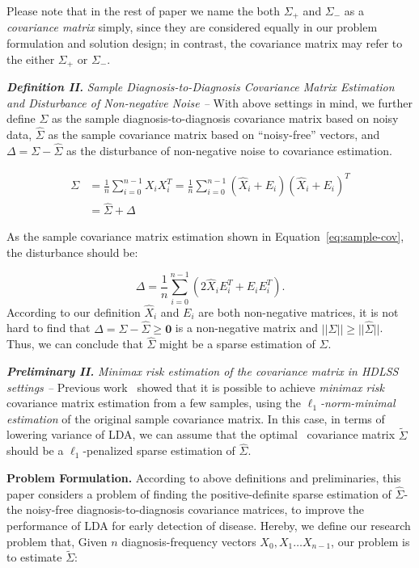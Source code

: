 Please note that in the rest of paper we name the both $\Sigma_{+}$ and $\Sigma_{-}$  as a \emph{covariance matrix} simply, since they are considered equally in our problem formulation and solution design; in contrast, the covariance matrix may refer to the either $\Sigma_{+}$ or $\Sigma_{-}$.


\textbf{\em Definition II.} \emph{Sample Diagnosis-to-Diagnosis Covariance Matrix Estimation and Disturbance of Non-negative Noise -- } With above settings in mind, we further define $\Sigma$ as the sample diagnosis-to-diagnosis covariance matrix based on noisy data, $\hat{\Sigma}$ as the sample covariance matrix based on ``noisy-free'' vectors, and  $\Delta=\Sigma-\hat{\Sigma}$ as the disturbance of non-negative noise to covariance estimation.

\begin{equation}
\begin{aligned}
\Sigma&=\frac{1}{n}\sum_{i=0}^{n-1} X_iX_i^T
=\frac{1}{n}\sum_{i=0}^{n-1} (\hat{X}_i+E_i)(\hat{X}_i+E_i)^T\\
&=\hat{\Sigma}+\Delta
\end{aligned}
\label{eq:sample-cov}
\end{equation}

As the sample covariance matrix estimation shown in Equation~\ref{eq:sample-cov}, the disturbance should be:

$$\Delta=\frac{1}{n}\sum_{i=0}^{n-1}(2\hat{X}_iE_i^T+E_iE_i^T).$$ 
%
According to our definition $\hat{X}_i$ and $E_i$ are both non-negative matrices, it is not hard to find that $\Delta=\Sigma-\hat{\Sigma}\geq \textbf{0}$ is a non-negative matrix and $||\Sigma||\geq ||\hat{\Sigma}||$.
Thus, we can conclude that $\hat{\Sigma}$ might be a sparse estimation of $\Sigma$.  

\textbf{\em Preliminary II.  } \emph{Minimax risk estimation of the covariance matrix in HDLSS settings -- } Previous work~\cite{cai2012minimax,xue2012positive} showed that it is possible to achieve \emph{minimax risk} covariance matrix estimation from a few samples, using the \emph{$\ell_1$-norm-minimal estimation} of the original sample covariance matrix.
In this case, in terms of lowering variance of LDA, we can assume that the optimal~\cite{cai2012minimax} covariance matrix $\tilde{\Sigma}$ should be a $\ell_1$-penalized sparse estimation of $\hat{\Sigma}$.


\textbf{Problem Formulation.  } According to above definitions and preliminaries, this paper considers a problem of finding the positive-definite sparse estimation of $\hat{\Sigma}$-the noisy-free diagnosis-to-diagnosis covariance matrices, to improve the performance of LDA for early detection of disease.
Hereby, we define our research problem that, Given $n$ diagnosis-frequency vectors $X_0,X_1\dots X_{n-1}$,  our problem is to estimate $\tilde{\Sigma}$: 

